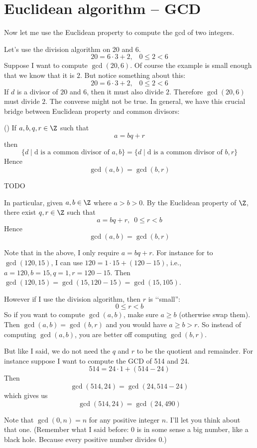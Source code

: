 \section{Euclidean algorithm -- GCD}

Now let me use the Euclidean property to compute the gcd of two integers.

Let's use the division algorithm on $20$ and $6$.
\[
20 = 6 \cdot 3 + 2, \,\,\,\,\, 0 \leq 2 < 6
\]
Suppose I want to compute $\gcd(20, 6)$.
Of course the example is small enough that we know that it is $2$.
But notice something about this:
\[
20 = 6 \cdot 3 + 2, \,\,\,\,\, 0 \leq 2 < 6
\]
If $d$ is a divisor of $20$ and $6$, then it must also divide
$2$.
Therefore $\gcd(20, 6)$ must divide $2$.
The converse might not be true.
In general, we have this crucial
bridge between Euclidean property and 
common divisors:

\begin{lem}
  \textnormal{()}
  If $a,b,q,r \in \Z$ such that  
  \[
  a = bq + r
  \]
  then
  \[
  \{ d \mid \text{d is a common divisor of $a, b$} \}
  =
  \{ d \mid \text{d is a common divisor of $b, r$} \}
  \]
  Hence
  \[
  \gcd(a,b) = \gcd(b, r)
  \]
\end{lem}
\proof
TODO


In particular, 
given $a, b \in \Z$ where $a > b > 0$.
By the Euclidean property of $\Z$, there exist $q,r \in \Z$ such that
\[
a = bq + r, \,\,\, 0 \leq r < b
\]
Hence
\[
\gcd(a,b) = \gcd(b, r)
\]

Note that in the above, I only require $a = bq + r$.
For instance for to $\gcd(120, 15)$, I can use
$120 = 1\cdot 15 + (120 - 15)$, i.e., $a = 120, b = 15, q = 1, r = 120-15$.
Then $\gcd(120, 15) = \gcd(15, 120-15) = \gcd(15, 105)$.

However if I use the division algorithm, then 
$r$ is \lq\lq small'':
\[
0 \leq r < b
\]
So if you want to compute $\gcd(a,b)$, make sure $a \geq b$ (otherwise
swap them).
Then $\gcd(a, b) = \gcd(b, r)$ and you would have $a \geq b > r$.
So instead of computing $\gcd(a, b)$, you are better off
computing $\gcd(b, r)$.

But like I said, we do not need the $q$ and $r$ to be the quotient
and remainder.
For instance suppose I want to compute the GCD of 514 and 24.
\[
514 = 24 \cdot 1 + (514 - 24)
\]
Then 
\[
\gcd(514, 24) = \gcd(24, 514 - 24)
\]
which gives us
\[
\gcd(514, 24) = \gcd(24, 490)
\]

Note that $\gcd(0, n) = n$ for any positive integer $n$.
I'll let you think about that one.
(Remember what I said before: 0 is in some sense a big number,
like a black hole. Because every positive number divides $0$.)

